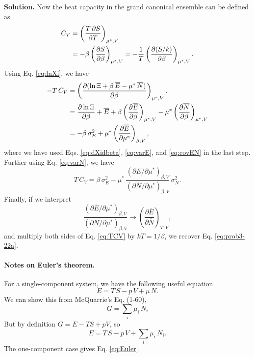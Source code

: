 \documentclass[twocolumn, 10pt]{article}
\numberwithin{equation}{section}
\newenvironment{solution}
{\par\medskip
  \textbf{Solution. }\ignorespaces}
{\medskip}
\begin{document}
\begin{solution}
Now the heat capacity in the grand canonical ensemble can be defined as
%
\begin{align}
C_V
&= \left( \frac{ T \, \partial S } { \partial T } \right)_{\mu^*, V}
\notag \\
&= -\beta \left( \frac{ \partial S } { \partial \beta } \right)_{\mu^*, V}
= -\frac{1}{T} \left( \frac{ \partial (S/k) } { \partial \beta } \right)_{\mu^*, V}.
\label{eq:CV_def}
\end{align}
%
Using Eq. \eqref{eq:lnXi}, we have
\begin{align}
-T \, C_V
  &= \left( \frac{ \partial (\ln \Xi + \beta \, \overline E - \mu^* \, \overline N) }
  { \partial \beta } \right)_{\mu^*, V}.
  \notag
  \\
  &= \frac{ \partial \ln \Xi } { \partial \beta }
  + \overline E
  + \beta \left( \frac{ \partial \overline E } { \partial \beta } \right)_{\mu^*, V}
  - \mu^* \left( \frac{ \partial \overline N } { \partial \beta } \right)_{\mu^*, V}
  \notag
  \\
  &=
  - \beta \, \sigma_E^2
  + \mu^* \left( \frac{ \partial \overline E } { \partial \mu^* } \right)_{\beta, V}
  ,
  \notag
\end{align}
%
where we have used Eqs. \eqref{eq:dXidbeta}, \eqref{eq:varE}, and \eqref{eq:covEN}
in the last step.
%
Further using Eq. \eqref{eq:varN}, we have
\begin{equation}
T \, C_V
=
\beta \, \sigma_E^2
-
\mu^* \,
\frac{ \left( \partial \overline E / \partial \mu^* \right)_{\beta, V} }
     { \left( \partial \overline N / \partial \mu^* \right)_{\beta, V} }
\, \sigma_N^2
.
\label{eq:TCV}
\end{equation}
%
Finally, if we interpret
$$
\frac{ \left( \partial \overline E / \partial \mu^* \right)_{\beta, V} }
     { \left( \partial \overline N / \partial \mu^* \right)_{\beta, V} }
\to
\left(
  \frac{ \partial \overline E }
       { \partial \overline N }
\right)_{T, V}
,
$$
and multiply both sides of Eq. \eqref{eq:TCV} by $k T = 1/\beta$,
we recover Eq. \eqref{eq:prob3-22a}.

\paragraph*{Notes on Euler's theorem.}

For a single-component system, we have
the following useful equation
\begin{equation}
  E = T \, S - p \, V + \mu \, N.
\label{eq:Euler}
\end{equation}
%
We can show this from McQuarrie's Eq. (1-60),
$$
G = \sum_i \mu_i \, N_i
$$
But by definition $G = E - TS + pV$, so
%
$$
  E = T \, S - p \, V + \sum_i \mu_i \, N_i.
$$
%
The one-component case gives Eq. \eqref{eq:Euler}.


\end{solution}
\end{document}
